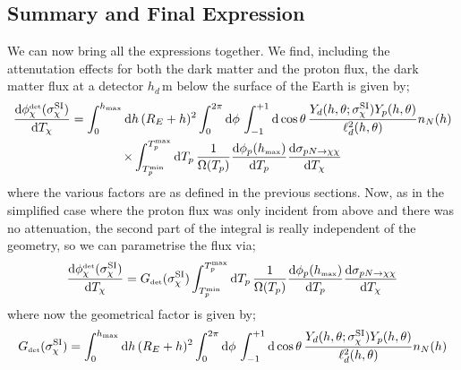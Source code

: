\documentclass[10pt]{article}
\begin{document}
\subsection{Summary and Final Expression}
We can now bring all the expressions together. We find, including the attenutation effects for both the dark matter and the proton flux, the dark matter flux at a detector $h_d \, \textrm{m}$ below the surface of the Earth is given by;
\begin{multline}
  \frac{\text{d} \phi^{\textrm{\tiny det}}_\chi(\sigma^{\textrm{SI}}_{\chi})}{\text{d} T_\chi} = \int_0^{h_{\textrm{\tiny max}}}{\text{d}h \,(R_E + h)^2 \int_{0}^{2\pi}{\text{d}\phi \, \int_{-1}^{+1}{\text{d}\cos\theta \, \frac{Y_d(h, \theta; \sigma^{\textrm{SI}}_{\chi})Y_p(h, \theta)}{\ell_d^2(h, \theta)} n_N(h)  }  }  } \\ \times \int_{T_p^{\textrm{\tiny min}}}^{T_p^{\textrm{\tiny max}}}{\text{d}T_p \,\frac{1}{\Omega(T_p)}\frac{\text{d}\phi_p(h_{\textrm{\tiny max}})}{\text{d} T_p}\frac{\text{d} \sigma_{pN \rightarrow \chi\chi}}{\text{d} T_\chi}   }
\end{multline}
where the various factors are as defined in the previous sections. Now, as in the simplified case where the proton flux was only incident from above and there was no attenuation, the second part of the integral is really independent of the geometry, so we can parametrise the flux via;
\begin{equation}
  \frac{\text{d} \phi^{\textrm{\tiny det}}_\chi(\sigma^{\textrm{SI}}_{\chi})}{\text{d} T_\chi} = G_{\textrm{\tiny det}}(\sigma^{\textrm{SI}}_{\chi}) \int_{T_p^{\textrm{\tiny min}}}^{T_p^{\textrm{\tiny max}}}{\text{d}T_p \,\frac{1}{\Omega(T_p)}\frac{\text{d}\phi_p(h_{\textrm{\tiny max}})}{\text{d} T_p}\frac{\text{d} \sigma_{pN \rightarrow \chi\chi}}{\text{d} T_\chi}   }
\end{equation}
where now the geometrical factor is given by;
\begin{equation}
  G_{\textrm{\tiny det}}(\sigma^{\textrm{SI}}_{\chi}) = \int_0^{h_{\textrm{\tiny max}}}{\text{d}h \,(R_E + h)^2 \int_{0}^{2\pi}{\text{d}\phi \, \int_{-1}^{+1}{\text{d}\cos\theta \, \frac{Y_d(h, \theta; \sigma^{\textrm{SI}}_{\chi})Y_p(h, \theta)}{\ell_d^2(h, \theta)} n_N(h)  }  }  }
\end{equation}
\end{document}
